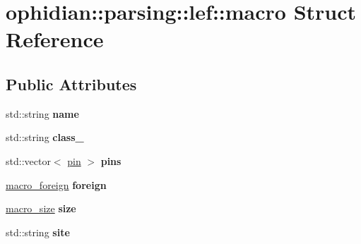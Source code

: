 \hypertarget{structophidian_1_1parsing_1_1lef_1_1macro}{\section{ophidian\-:\-:parsing\-:\-:lef\-:\-:macro Struct Reference}
\label{structophidian_1_1parsing_1_1lef_1_1macro}
}
\subsection*{Public Attributes}
\begin{DoxyCompactItemize}
\item 
\hypertarget{structophidian_1_1parsing_1_1lef_1_1macro_a93400852fbe73c7581cd716039869e56}{std\-::string {\bfseries name}}\label{structophidian_1_1parsing_1_1lef_1_1macro_a93400852fbe73c7581cd716039869e56}

\item 
\hypertarget{structophidian_1_1parsing_1_1lef_1_1macro_a5c91f3997c139a63399aa8f6fc39a8e4}{std\-::string {\bfseries class\-\_\-}}\label{structophidian_1_1parsing_1_1lef_1_1macro_a5c91f3997c139a63399aa8f6fc39a8e4}

\item 
\hypertarget{structophidian_1_1parsing_1_1lef_1_1macro_a5eaa9f18d441c88e94b1c40a2fccf529}{std\-::vector$<$ \hyperlink{structophidian_1_1parsing_1_1lef_1_1pin}{pin} $>$ {\bfseries pins}}\label{structophidian_1_1parsing_1_1lef_1_1macro_a5eaa9f18d441c88e94b1c40a2fccf529}

\item 
\hypertarget{structophidian_1_1parsing_1_1lef_1_1macro_ad3aada5b4df69451b98056523757ff6f}{\hyperlink{structophidian_1_1parsing_1_1lef_1_1macro__foreign}{macro\-\_\-foreign} {\bfseries foreign}}\label{structophidian_1_1parsing_1_1lef_1_1macro_ad3aada5b4df69451b98056523757ff6f}

\item 
\hypertarget{structophidian_1_1parsing_1_1lef_1_1macro_a4ea07d71bcce8af25fa624606f48f7be}{\hyperlink{structophidian_1_1parsing_1_1lef_1_1macro__size}{macro\-\_\-size} {\bfseries size}}\label{structophidian_1_1parsing_1_1lef_1_1macro_a4ea07d71bcce8af25fa624606f48f7be}

\item 
\hypertarget{structophidian_1_1parsing_1_1lef_1_1macro_ac9412894a8200e4cb83a4ee893f14b42}{std\-::string {\bfseries site}}\label{structophidian_1_1parsing_1_1lef_1_1macro_ac9412894a8200e4cb83a4ee893f14b42}


\end{DoxyCompactItemize}

